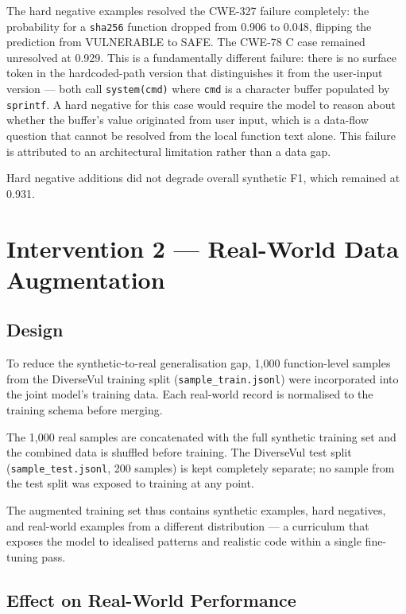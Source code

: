 The hard negative examples resolved the CWE-327 failure completely: the probability for a
\texttt{sha256} function dropped from 0.906 to 0.048, flipping the prediction from
VULNERABLE to SAFE.
The CWE-78 C case remained unresolved at 0.929.
This is a fundamentally different failure: there is no surface token in the hardcoded-path
version that distinguishes it from the user-input version --- both call
\texttt{system(cmd)} where \texttt{cmd} is a character buffer populated by \texttt{sprintf}.
A hard negative for this case would require the model to reason about whether the buffer's
value originated from user input, which is a data-flow question that cannot be resolved from
the local function text alone.
This failure is attributed to an architectural limitation rather than a data gap.

Hard negative additions did not degrade overall synthetic F1, which remained at 0.931.

\section{Intervention 2 --- Real-World Data Augmentation}

\subsection{Design}

To reduce the synthetic-to-real generalisation gap, 1{,}000 function-level samples from
the DiverseVul training split (\texttt{sample\_train.jsonl}) were incorporated into the
joint model's training data.
Each real-world record is normalised to the training schema before merging.

The 1{,}000 real samples are concatenated with the full synthetic training set and the
combined data is shuffled before training.
The DiverseVul test split (\texttt{sample\_test.jsonl}, 200 samples) is kept completely
separate; no sample from the test split was exposed to training at any point.

The augmented training set thus contains synthetic examples, hard negatives, and
real-world examples from a different distribution --- a curriculum that exposes the model
to idealised patterns and realistic code within a single fine-tuning pass.

\subsection{Effect on Real-World Performance}


